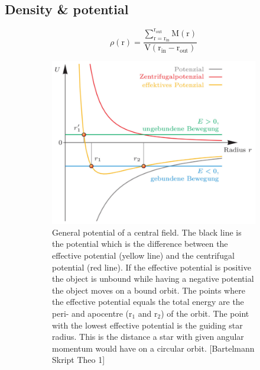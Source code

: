 \subsection{Density \& potential}\label{dens_pot_theory}
\begin{equation}\label{eq:density}
\rho(\mathrm{r})=\frac{\sum_{\mathrm{r=r_{in}}}^{\mathrm{r_{out}}}\mathrm{M(r)}}{\mathrm{V(r_{in}-r_{out})}}
\end{equation}
\begin{figure}[htbp]
\centering
	\begin{subfigure}{0.475\textwidth}
	\includegraphics[width=\textwidth]{Plots/eff_potential_bartelmann.png}
	\caption{General potential of a central field. The black line is the potential which is the difference between the effective potential (yellow line) and the centrifugal potential (red line). If the effective potential is positive the object is unbound while having a negative potential the object moves on a bound orbit. The points where the effective potential equals the total energy are the peri- and apocentre (r\(_1\) and r\(_2\)) of the orbit. The point with the lowest effective potential is the guiding star radius. This is the distance a star with given angular momentum would have on a circular orbit. [Bartelmann Skript Theo 1]}
	\label{fig:eff_potential_bartelmann}
	\end{subfigure}
	\hfill
	\begin{subfigure}{0.475\textwidth}

\end{subfigure}
\end{figure}
